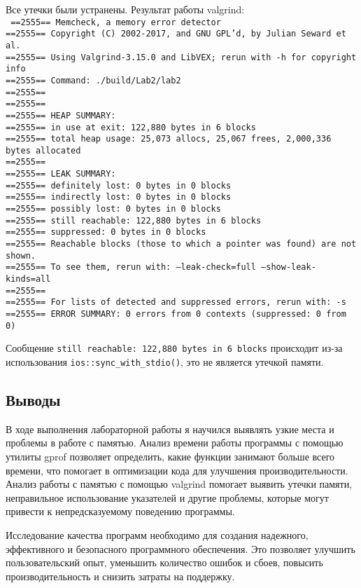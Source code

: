 \documentclass[12pt]{article}
\begin{document}
Все утечки были устранены. Результат работы valgrind: \\
\texttt{
    ==2555== Memcheck, a memory error detector \\
    ==2555== Copyright (C) 2002-2017, and GNU GPL'd, by Julian Seward et al. \\
    ==2555== Using Valgrind-3.15.0 and LibVEX; rerun with -h for copyright info \\
    ==2555== Command: ./build/Lab2/lab2 \\
    ==2555==  \\
    ==2555==  \\
    ==2555== HEAP SUMMARY: \\
    ==2555==     in use at exit: 122,880 bytes in 6 blocks \\
    ==2555==   total heap usage: 25,073 allocs, 25,067 frees, 2,000,336 bytes allocated \\
    ==2555==  \\
    ==2555== LEAK SUMMARY: \\
    ==2555==    definitely lost: 0 bytes in 0 blocks \\
    ==2555==    indirectly lost: 0 bytes in 0 blocks \\
    ==2555==      possibly lost: 0 bytes in 0 blocks \\
    ==2555==    still reachable: 122,880 bytes in 6 blocks \\
    ==2555==         suppressed: 0 bytes in 0 blocks \\
    ==2555== Reachable blocks (those to which a pointer was found) are not shown. \\
    ==2555== To see them, rerun with: --leak-check=full --show-leak-kinds=all \\
    ==2555==  \\
    ==2555== For lists of detected and suppressed errors, rerun with: -s \\
    ==2555== ERROR SUMMARY: 0 errors from 0 contexts (suppressed: 0 from 0) \\
}

Сообщение \texttt{still reachable: 122,880 bytes in 6 blocks} происходит из-за использования \texttt{ios::sync\_with\_stdio()}, это не является утечкой памяти.

\newpage
\subsection*{Выводы}

В ходе выполнения лабораторной работы я научился выявлять узкие места и проблемы в работе с памятью.
Анализ времени работы программы с помощью утилиты gprof позволяет определить, какие функции занимают больше всего времени,
что помогает в оптимизации кода для улучшения производительности. Анализ работы с памятью с помощью valgrind помогает выявить утечки памяти,
неправильное использование указателей и другие проблемы, которые могут привести к непредсказуемому поведению программы.

Исследование качества программ необходимо для создания надежного, эффективного и безопасного программного обеспечения.
Это позволяет улучшить пользовательский опыт, уменьшить количество ошибок и сбоев, повысить производительность и снизить затраты на поддержку.
\end{document}
